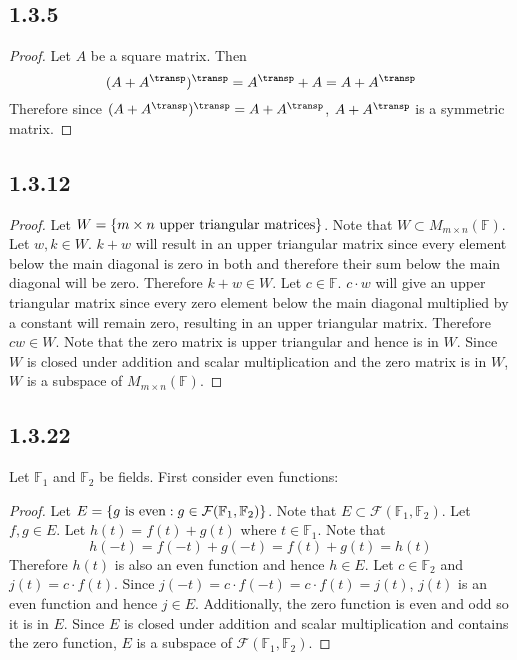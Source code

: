 \documentclass[12pt,titlepage]{extarticle}
\begin{document}
\subsection*{1.3.5}
\begin{proof}
	Let $A$ be a square matrix. Then
	\[
		(A + A^\transp)^\transp = A^\transp + A = A + A^\transp
	\]
	Therefore since $(A + A^\transp)^\transp = A + A^\transp$, $A + A^\transp$ is a symmetric matrix.
\end{proof}

\subsection*{1.3.12}
\begin{proof}
	Let $W = \qty{m\times n\text{ upper triangular matrices}}$. Note that $W \subset M_{m\times n}(\mathbb{F})$. Let $w, k \in W$. $k + w$ will result in an upper triangular matrix since every element below the main diagonal is zero in both and therefore their sum below the main diagonal will be zero. Therefore $k + w \in W$. Let $c \in \mathbb{F}$. $c \cdot w$ will give an upper triangular matrix since every zero element below the main diagonal multiplied by a constant will remain zero, resulting in an upper triangular matrix. Therefore $cw \in W$. Note that the zero matrix is upper triangular and hence is in $W$. Since $W$ is closed under addition and scalar multiplication and the zero matrix is in $W$, $W$ is a subspace of $M_{m\times n} (\mathbb{F})$.
\end{proof}

\subsection*{1.3.22}
\def\funfield{\mathcal{F}(\mathbb{F}_1, \mathbb{F}_2)}

Let $\mathbb{F}_1$ and $\mathbb{F}_2$ be fields. First consider even functions:
\begin{proof}
	Let $E = \qty{g\text{ is even} : g\in\funfield}$. Note that $E \subset \funfield$. Let $f,g \in E$. Let $h(t) = f(t) + g(t)$ where $t \in \mathbb{F}_1$. Note that
	\[
		h(-t) = f(-t) + g(-t) = f(t) + g(t) = h(t)
	\]
	Therefore $h(t)$ is also an even function and hence $h \in E$. Let $c \in \mathbb{F}_2$ and $j(t) = c \cdot f(t)$. Since $j(-t) = c \cdot f(-t) = c \cdot f(t) = j(t)$, $j(t)$ is an even function and hence $j \in E$. Additionally, the zero function is even and odd so it is in $E$. Since $E$ is closed under addition and scalar multiplication and contains the zero function, $E$ is a subspace of $\funfield$.
\end{proof}
\end{document}
